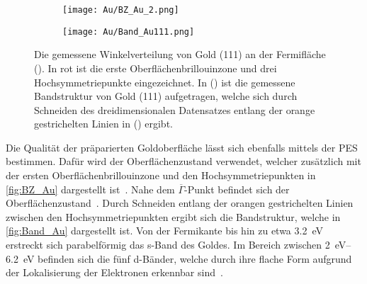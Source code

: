         \begin{figure}
            \centering
            \begin{subfigure}[t]{0.34\textwidth}
                \centering
                \texttt{[image: Au/BZ\_Au\_2.png]}
                \subcaption{}
                \label{fig:BZ_Au}
            \end{subfigure}
            \begin{subfigure}[t]{0.62\textwidth}
                \centering
                \texttt{[image: Au/Band\_Au111.png]}
                \subcaption{}
                \label{fig:Band_Au}
            \end{subfigure}
            \caption{Die gemessene Winkelverteilung von Gold (111) an der Fermifläche ().
            In rot ist die erste Oberflächenbrillouinzone und drei Hochsymmetriepunkte eingezeichnet.
            In () ist die gemessene Bandstruktur von Gold (111) aufgetragen, welche sich durch Schneiden des dreidimensionalen Datensatzes entlang der orange gestrichelten Linien in () ergibt.}
        \end{figure}
        Die Qualität der präparierten Goldoberfläche lässt sich ebenfalls mittels der PES bestimmen.
        Dafür wird der Oberflächenzustand verwendet, welcher zusätzlich mit der ersten Oberflächenbrillouinzone und den Hochsymmetriepunkten in \autoref{fig:BZ_Au} dargestellt ist~\cite{Au_3}.
        Nahe dem $\overline{\Gamma}$-Punkt befindet sich der Oberflächenzustand~\cite{Au_1}.
        Durch Schneiden entlang der orangen gestrichelten Linien zwischen den Hochsymmetriepunkten ergibt sich die Bandstruktur, welche in \autoref{fig:Band_Au} dargestellt ist.
        Von der Fermikante bis hin zu etwa \SI{3.2}{\electronvolt} erstreckt sich parabelförmig das s-Band des Goldes.
        Im Bereich zwischen \SIrange{2}{6.2}{\electronvolt} befinden sich die fünf d-Bänder, welche durch ihre flache Form aufgrund der Lokalisierung der Elektronen erkennbar sind~\cite{yan_topological_2015}.

